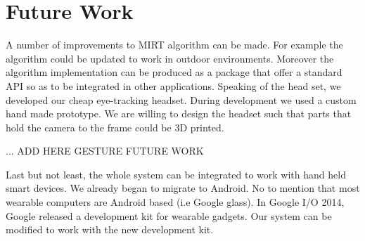 \section{Future Work} 
A number of improvements to MIRT algorithm can be made. For example the algorithm could be updated to work in outdoor environments. Moreover the algorithm implementation can be produced as a package that offer a standard API so as to be integrated in other applications. Speaking of the head set, we developed our cheap eye-tracking headset. During development we used a custom hand made prototype. We are willing to design the headset such that parts that hold the camera to the frame could be 3D printed. \bigskip

... ADD HERE GESTURE FUTURE WORK \bigskip


Last but not least, the whole system can be integrated to work with hand held smart devices. We already began to migrate to Android. No to mention that most wearable computers are Android based (i.e Google glass). In Google I/O 2014, Google released a development kit for wearable gadgets. Our system can be modified to work with the new development kit.

